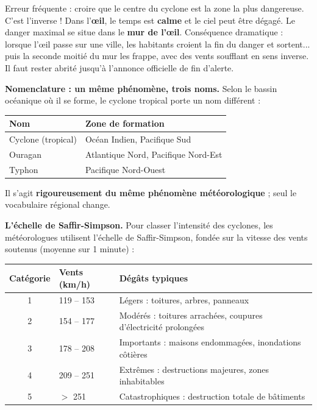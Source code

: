 \documentclass[11pt]{article}
\begin{document}
\begin{attention}
Erreur fréquente : croire que le centre du cyclone est la zone la plus dangereuse. C'est l'inverse ! Dans l'\textbf{œil}, le temps est \textbf{calme} et le ciel peut être dégagé. Le danger maximal se situe dans le \textbf{mur de l'œil}. Conséquence dramatique : lorsque l'œil passe sur une ville, les habitants croient la fin du danger et sortent... puis la seconde moitié du mur les frappe, avec des vents soufflant en sens inverse. Il faut rester abrité jusqu'à l'annonce officielle de fin d'alerte.
\end{attention}

\textbf{Nomenclature : un même phénomène, trois noms.} Selon le bassin océanique où il se forme, le cyclone tropical porte un nom différent :

\begin{center}
\begin{tabularx}{\linewidth}{|l|X|}\hline
\rowcolor{popblueL} \textbf{Nom} & \textbf{Zone de formation} \\ \hline
Cyclone (tropical) & Océan Indien, Pacifique Sud \\ \hline
Ouragan & Atlantique Nord, Pacifique Nord-Est \\ \hline
Typhon & Pacifique Nord-Ouest \\ \hline
\end{tabularx}
\end{center}

Il s'agit \textbf{rigoureusement du même phénomène météorologique} ; seul le vocabulaire régional change.

\textbf{L'échelle de Saffir-Simpson.} Pour classer l'intensité des cyclones, les météorologues utilisent l'échelle de Saffir-Simpson, fondée sur la vitesse des vents soutenus (moyenne sur 1 minute) :

\begin{center}
\begin{tabularx}{\linewidth}{|c|X|X|}\hline
\rowcolor{popblueL} \textbf{Catégorie} & \textbf{Vents (km/h)} & \textbf{Dégâts typiques} \\ \hline
1 & 119 -- 153 & Légers : toitures, arbres, panneaux \\ \hline
2 & 154 -- 177 & Modérés : toitures arrachées, coupures d'électricité prolongées \\ \hline
3 & 178 -- 208 & Importants : maisons endommagées, inondations côtières \\ \hline
4 & 209 -- 251 & Extrêmes : destructions majeures, zones inhabitables \\ \hline
5 & $>$ 251 & Catastrophiques : destruction totale de bâtiments \\ \hline
\end{tabularx}
\end{center}
\end{document}
